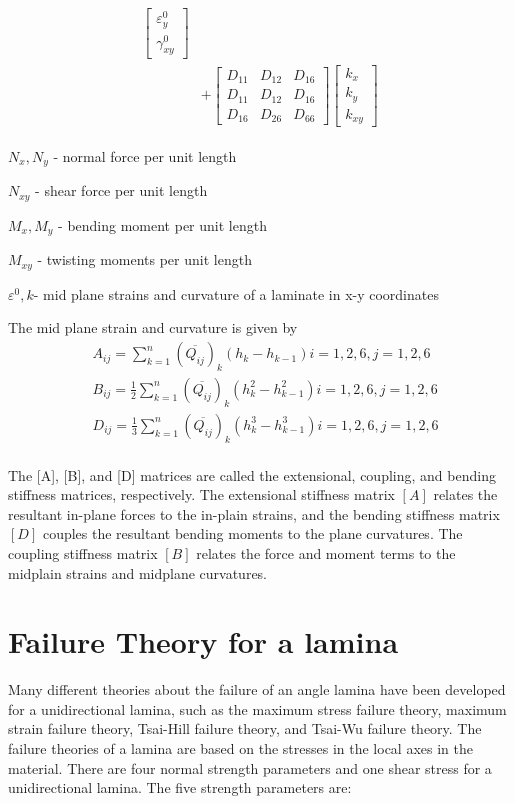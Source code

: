 \documentclass{article}
\begin{document}
\begin{equation}
\begin{array}{l}
\begin{aligned}
\begin{bmatrix}
        \varepsilon_y^0 \\
		\gamma_{xy}^0
    \end{bmatrix} \\ 
	&+  
	\begin{bmatrix}
		D_{11} & D_{12} & D_{16} \\
		D_{11} & D_{12} & D_{16} \\
		D_{16} & D_{26} & D_{66} 
	\end{bmatrix}
	\begin{bmatrix}
		k_x \\
		k_y \\
		k_{xy} 
	\end{bmatrix}
\end{aligned}
	\end{array}
\end{equation}


$N_x,N_y $  - normal force per unit length

$N_{xy} $  - shear force per unit length

$M_x, M_y $ - bending moment per unit length

$M_{xy} $  - twisting moments per unit length

$\varepsilon^{0}, k $- mid plane strains and curvature of a laminate in x-y coordinates

The mid plane strain and curvature is given by
\begin{equation}
    \begin{split}
    &A_{ij}=\sum_{k=1}^{n}(\overline{Q_{ij}})_k(h_k-h_{k-1})  i=1,2,6, j=1,2,6\\
    &B_{ij}=\frac{1}{2}\sum_{k=1}^{n}(\overline{Q_{ij}})_k(h_k^2 - h_{k-1}^2)  i=1,2,6, j=1,2,6\\
    &D_{ij}=\frac{1}{3}\sum_{k=1}^{n}(\overline{Q_{ij}})_k(h_k^3 - h_{k-1}^3) i=1,2,6, j=1,2,6\\
    \end{split}
\end{equation}

The [A], [B], and [D] matrices are called the extensional, coupling, and bending stiffness matrices,
respectively. The extensional stiffness matrix $[A]$ relates the resultant in-plane forces to the
in-plain strains, and the bending stiffness matrix $[D]$ couples the resultant bending moments to
the plane curvatures.  The coupling stiffness matrix $[B]$ relates the force and moment terms to the
midplain strains and midplane curvatures.


\section{Failure Theory for a lamina}
Many different theories about the failure of an angle lamina have been developed for a
unidirectional lamina, such as the maximum stress failure theory, maximum strain failure theory,
Tsai-Hill failure theory, and Tsai-Wu failure theory. The failure theories of a lamina are based on
the stresses in the local axes in the material. There are four normal strength parameters and one shear
stress for a unidirectional lamina. The five strength parameters are:
\end{document}
